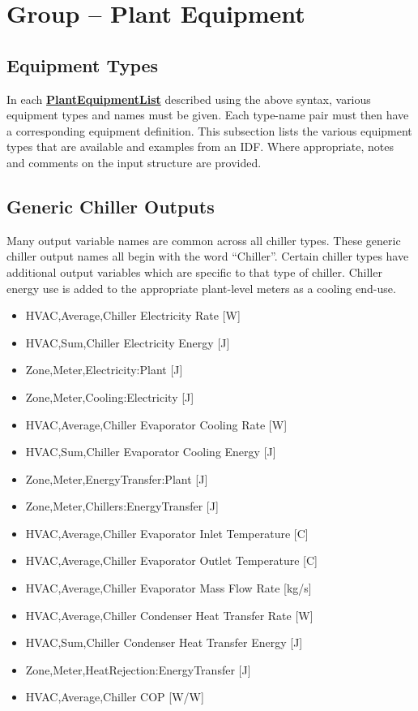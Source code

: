 \section{Group -- Plant Equipment}\label{group-plant-equipment}

\subsection{Equipment Types}\label{equipment-types-000}

In each \textbf{\hyperref[plantequipmentlist]{PlantEquipmentList}} described using the above syntax, various equipment types and names must be given. Each type-name pair must then have a corresponding equipment definition. This subsection lists the various equipment types that are available and examples from an IDF. Where appropriate, notes and comments on the input structure are provided.

\subsection{Generic Chiller Outputs}\label{generic-chiller-outputs}

Many output variable names are common across all chiller types. These generic chiller output names all begin with the word ``Chiller''. Certain chiller types have additional output variables which are specific to that type of chiller. Chiller energy use is added to the appropriate plant-level meters as a cooling end-use.

\begin{itemize}
    \item
    HVAC,Average,Chiller Electricity Rate {[}W{]}
    \item
    HVAC,Sum,Chiller Electricity Energy {[}J{]}
    \item
    Zone,Meter,Electricity:Plant {[}J{]}
    \item
    Zone,Meter,Cooling:Electricity {[}J{]}
    \item
    HVAC,Average,Chiller Evaporator Cooling Rate {[}W{]}
    \item
    HVAC,Sum,Chiller Evaporator Cooling Energy {[}J{]}
    \item
    Zone,Meter,EnergyTransfer:Plant {[}J{]}
    \item
    Zone,Meter,Chillers:EnergyTransfer {[}J{]}
    \item
    HVAC,Average,Chiller Evaporator Inlet Temperature {[}C{]}
    \item
    HVAC,Average,Chiller Evaporator Outlet Temperature {[}C{]}
    \item
    HVAC,Average,Chiller Evaporator Mass Flow Rate {[}kg/s{]}
    \item
    HVAC,Average,Chiller Condenser Heat Transfer Rate {[}W{]}
    \item
    HVAC,Sum,Chiller Condenser Heat Transfer Energy {[}J{]}
    \item
    Zone,Meter,HeatRejection:EnergyTransfer {[}J{]}
    \item
    HVAC,Average,Chiller COP {[}W/W{]}
\end{itemize}


